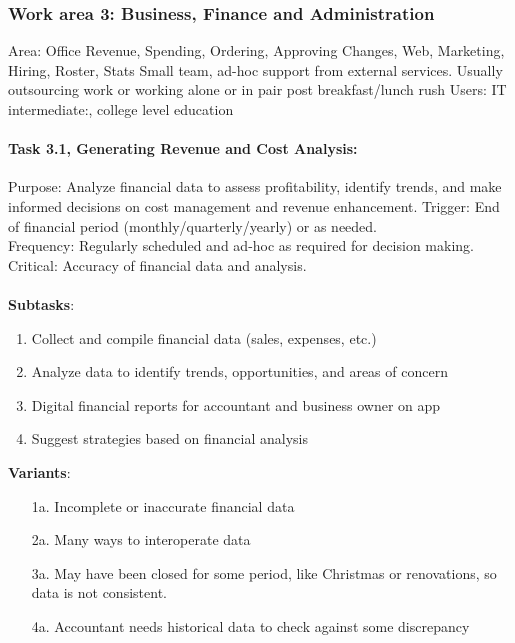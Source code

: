 \documentclass{article}
\begin{document}
\clearpage
\subsubsection{Work area 3: Business, Finance and Administration}
Area: Office
Revenue, Spending, Ordering, Approving Changes, Web, Marketing, Hiring, Roster, Stats
Small team, ad-hoc support from external services.
Usually outsourcing work or working alone or in pair post breakfast/lunch rush
Users: IT intermediate:, college level education

\paragraph{Task 3.1, Generating Revenue and Cost Analysis:}
Purpose: Analyze financial data to assess profitability, identify trends, and make informed decisions on cost management and revenue enhancement.
Trigger: End of financial period (monthly/quarterly/yearly) or as needed.\\
Frequency: Regularly scheduled and ad-hoc as required for decision making.\\
Critical: Accuracy of financial data and analysis.\\
\\
\textbf{Subtasks}:
\begin{enumerate}
    \item Collect and compile financial data (sales, expenses, etc.)
    \item Analyze data to identify trends, opportunities, and areas of concern
    \item Digital financial reports for accountant and business owner on app
    \item Suggest strategies based on financial analysis
\end{enumerate}
\textbf{Variants}:
\begin{enumerate}
    \item [1a.] Incomplete or inaccurate financial data
    \item [2a.] Many ways to interoperate data
    \item [3a.] May have been closed for some period, like Christmas or renovations, so data is not consistent. 
    \item [4a.] Accountant needs historical data to check against some discrepancy
\end{enumerate}
\end{document}
